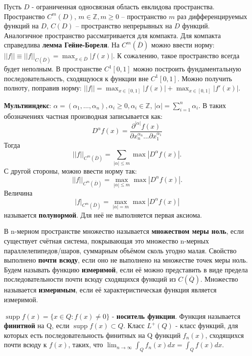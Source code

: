 \documentclass[11pt]{article}
\newcounter{th}\setcounter{th}{0}
\begin{document}
Пусть $D$ - ограниченная односвязная область евклидова пространства. Пространство $C^m(D)$,
$m \in \mathbb{Z}, m \geq 0$ -- пространство $m$ раз дифференцируемых функций на $D$, $C(D)$ --
пространство непрерывных на $D$ функций. Аналогичное пространство рассматривается для
компакта. Для компакта справедлива \textbf{лемма Гейне-Бореля}. На $C^m(\overline{D})$ можно
ввести норму: $||f|| \equiv ||f||_{C(\overline{D})} = \max_{x \in \overline{D}}|f(x)|$. К сожалению,
такое пространство всегда будет неполным. В пространстве $C^1[0, 1]$ можно построить
фундаментальную последовательность, сходящуюся к функции вне $C^1[0, 1]$. Можно получить
полноту, поправив норму: $||f|| = \max_{x \in [0, 1]}|f(x)| + \max_{x \in [0, 1]}|f'(x)|$.

\textbf{Мультииндекс}: $\alpha = (\alpha_1, \ldots, \alpha_n), \alpha_i \geq 0, \alpha_i \in \mathbb{Z}$,
$|\alpha| = \sum_{i = 1}^n\alpha_i$. В таких обозначениях частная производная записывается как:
\begin{equation}
D^{\alpha}f(x) = \frac{\partial^{|\alpha|}f(x)}{\partial x_n^{\alpha_n}\ldots\partial x_1^{\alpha_1}}
\end{equation}
Тогда
\begin{equation}
||f||_{C^m(\overline{D})} = \sum_{|\alpha| \leq m}\max|D^{\alpha}f(x)|.
\end{equation}
С другой стороны, можно ввести норму так:
\begin{equation}
||f||_{C^m(\overline{D})} = \max_{|\alpha| \leq m}\max|D^{\alpha}f(x)|.
\end{equation}
Величина
\begin{equation}
|f|_{C^m(\overline{D})} = \max_{|\alpha| = m}\max|D^{\alpha}f(x)|
\end{equation}
называется \textbf{полунормой}. Для неё не выполняется первая аксиома.

В n-мерном пространстве множество называется \textbf{множеством меры ноль}, если существует
счётная система, покрывающая это множество n-мерных параллелепипедов/шаров, суммарным объёмом
сколь угодно малая. Свойство выполнено \textbf{почти всюду}, если оно не выполнено на множестве
точек меры ноль. Будем называть функцию \textbf{измеримой}, если её можно представить в виде
предела последовательности почти всюду сходящихся функций из $C(\overline{Q})$. Множество
называется \textbf{измеримым}, если её характеристическая функция является измеримой.

$\operatorname{supp} f(x) = \{x \in Q: f(x) \neq 0\}$ - \textbf{носитель функции}. Функция называется
\textbf{финитной} на Q, если $\operatorname{supp} f(x) \subset Q$.
Класс $L^+(Q)$ - класс функций, для которых есть последовательность финитных на Q функций $f_n(x)$,
сходящихся почти всюду к $f(x)$, таких, что $\lim_{n \to \infty}\int_Qf_n(x)dx = \int_Qf(x)dx$.
\end{document}
